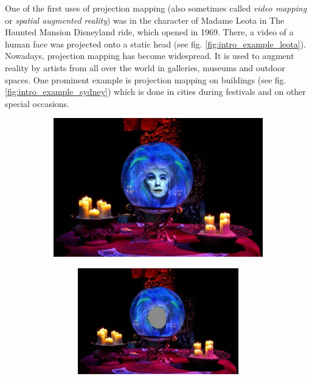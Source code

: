 One of the first uses of projection mapping (also sometimes called \textit{video mapping} or \textit{spatial augmented reality}) was in the character of Madame Leota in The Haunted Mansion Disneyland ride, which opened in 1969. There, a video of a human face was projected onto a static head (see fig. \ref{fig:intro_example_leota}). Nowadays, projection mapping has become widespread. It is used to augment reality by artists from all over the world in galleries, museums and outdoor spaces. One prominent example is projection mapping on buildings (see fig. \ref{fig:intro_example_sydney}) which is done in cities during festivals and on other special occasions.

\begin{figure}[ht]
    \centering
    \begin{subfigure}{0.6\textwidth}
        \centering
        \includegraphics[width=\textwidth]{images/01-Leota.jpg}
        \caption{}
        \label{fig:intro_example_leota-full}
    \end{subfigure}
    \hfill
    \begin{subfigure}{0.39\textwidth}
        \centering
        \begin{subfigure}{\textwidth}
            \centering
            \includegraphics[width=\textwidth]{images/01-Leota-no_head.jpg}
            \caption{}
            \label{fig:intro_example_leota-scene}
        \end{subfigure}
        

\end{subfigure}
\end{figure}
